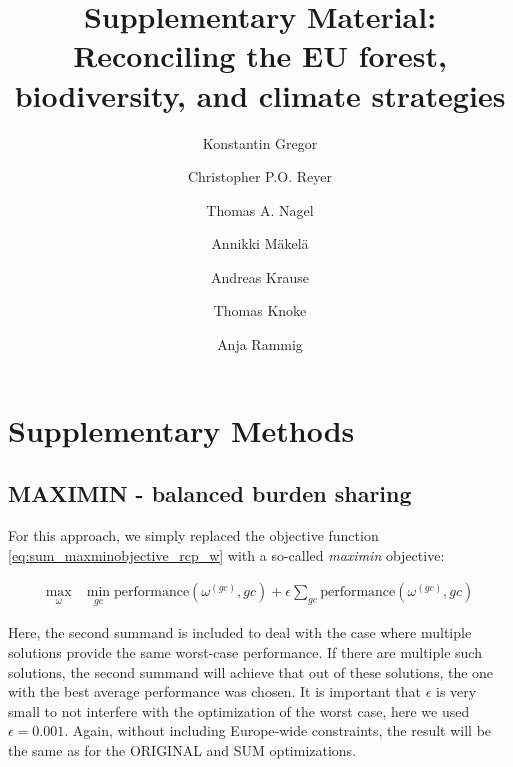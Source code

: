 \documentclass[]{article}
\title{Supplementary Material: Reconciling the EU forest, biodiversity, and climate strategies}
\newcommand\SupplementaryMaterials{%
\xdef\presupfigures{\arabic{figure}}%
\xdef\presupsections{\arabic{section}}%
\xdef\presuptables{\arabic{table}}%
\renewcommand\thefigure{S\fpeval{\arabic{figure}-\presupfigures}}
\renewcommand\thesection{S\fpeval{\arabic{section}-\presupsections}}
\renewcommand\thetable{S\fpeval{\arabic{table}-\presuptables}}
}
\begin{document}
\author[1,*]{Konstantin Gregor}
\author[2]{Christopher P.O. Reyer}
\author[3]{Thomas A. Nagel}
\author[4, 5]{Annikki Mäkelä}
\author[1]{Andreas Krause}
\author[1]{Thomas Knoke}
\author[1]{Anja Rammig}


\date{} 
\setcounter{Maxaffil}{0}

\maketitle



\newpage

\SupplementaryMaterials

\section{Supplementary Methods}

\subsection{MAXIMIN - balanced burden sharing}\label{sec:maximin}
For this approach, we simply replaced the objective function \ref{eq:sum_maxminobjective_rcp_w} with a so-called \textit{maximin} objective:

\begin{align}
	\max_{\omega} & \min_{gc} \mbox{performance}(\omega^{(gc)}, gc)  +  \epsilon \sum_{gc} \mbox{performance}(\omega^{(gc)}, gc)   \label{eq:maximin_maxminobjective_rcp_w}
\end{align}

\noindent Here, the second summand is included to deal with the case where multiple solutions provide the same worst-case performance. If there are multiple such solutions, the second summand will achieve that out of these solutions, the one with the best average performance was chosen. It is important that $\epsilon$ is very small to not interfere with the optimization of the worst case, here we used $\epsilon=0.001$.
Again, without including Europe-wide constraints, the result will be the same as for the ORIGINAL and SUM optimizations.
\end{document}
